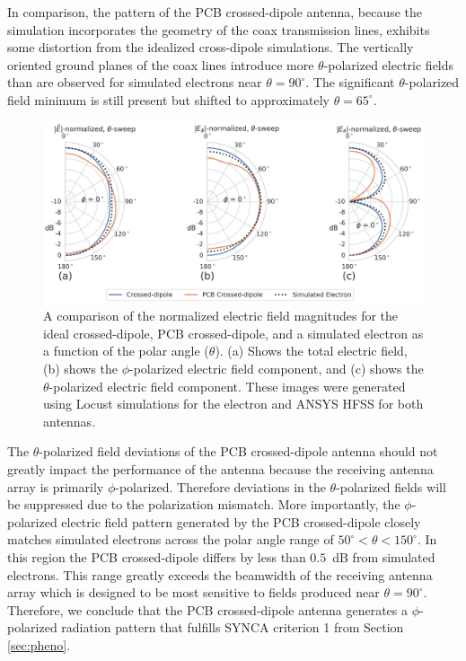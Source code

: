 In comparison, the pattern of the PCB crossed-dipole antenna, because the simulation incorporates the geometry of the coax transmission lines, exhibits some distortion from the idealized cross-dipole simulations. The vertically oriented ground planes of the coax lines introduce more $\theta$-polarized electric fields than are observed for simulated electrons near $\theta=90^\circ$. The significant $\theta$-polarized field minimum is still present but shifted to approximately $\theta=65^\circ$.
\begin{figure}[h]
    \centering
    \includegraphics[width=1.\textwidth]{figs/Chapter-5/221101_field_mag_comparison_theta_only.png}
    \caption{A comparison of the normalized electric field magnitudes for the ideal crossed-dipole, PCB crossed-dipole, and a simulated electron as a function of the polar angle ($\theta$). (a) Shows the total electric field, (b) shows the $\phi$-polarized electric field component, and (c) shows the $\theta$-polarized electric field component. These images were generated using Locust simulations for the electron and ANSYS HFSS for both antennas.} 
    \label{fig:field-comparison-theta}
\end{figure}
The $\theta$-polarized field deviations of the PCB crossed-dipole antenna should not greatly impact the performance of the antenna because the receiving antenna array is primarily $\phi$-polarized. Therefore deviations in the $\theta$-polarized fields will be suppressed due to the polarization mismatch. More importantly, the $\phi$-polarized electric field pattern generated by the PCB crossed-dipole closely matches simulated electrons across the polar angle range of $50^\circ<\theta<150^\circ$. In this region the PCB crossed-dipole differs by less than $0.5$~dB from simulated electrons. This range greatly exceeds the beamwidth of the receiving antenna array which is designed to be most sensitive to fields produced near $\theta=90^\circ$. Therefore, we conclude that the PCB crossed-dipole antenna generates a $\phi$-polarized radiation pattern that fulfills SYNCA criterion 1 from Section \ref{sec:pheno}.

